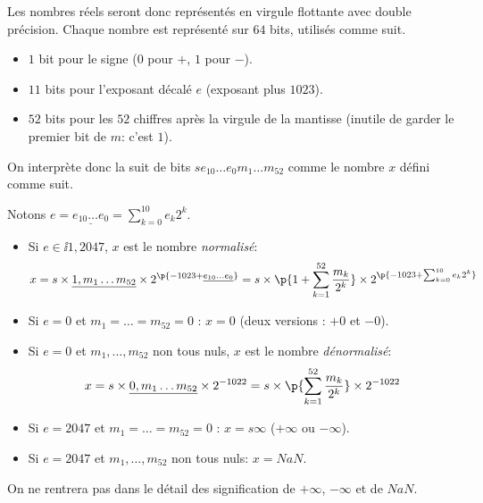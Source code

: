 
Les nombres réels seront donc représentés en virgule flottante avec double précision. Chaque nombre est  représenté sur $64$ bits, utilisés comme suit.
\begin{itemize}
\item[\textbullet] $1$ bit pour le signe ($0$ pour $+$, $1$ pour $-$).
\item[\textbullet] $11$ bits pour l'exposant décalé $e$ (exposant plus $1023$).
\item[\textbullet] $52$ bits pour les $52$ chiffres après la virgule de la mantisse
  (inutile de garder le premier bit de $m$: c'est $1$).
\end{itemize}

On interprète donc la suit de bits $se_{10}\ldots e_{0}m_{1}\ldots m_{52}$ comme le nombre $x$ défini comme suit. 

Notons $\displaystyle e  = \underline{e_{10}\ldots e_{0}} = \sum_{k=0}^{10} e_k2^k$. 
\begin{itemize}
  \item Si $e\in\ii{1,2047}$, $x$ est le  nombre \emph{normalisé}:
\begin{equation*}
  x = s \times \underline{1,m_{1}\ldots m_{52}}\times
  2^{\p{-1023+\underline{e_{10}\ldots  e_{0}}}}
  = 
  s \times \p{1+\sum_{k=1}^{52} \frac{m_{k}}{2^{k}}}
  \times 2^{\p{-1023 + \sum_{k=0}^{10} e_{k}2^{k}}}
\end{equation*}

\item Si $e = 0$ et $m_{1}=\dots=m_{52}=0$ : $x=0$ (deux
  versions : $+0$ et $-0$).

\item  Si $e = 0$ et $m_{1},\ldots,m_{52}$ non tous nuls, $x$ est le nombre
\emph{dénormalisé}:
\begin{equation*}
  x = s \times \underline{0,m_{1}\ldots m_{52}}\times
  2^{-1022}
  = 
  s \times \p{\sum_{k=1}^{52} \frac{m_{k}}{2^{k}}}
  \times 2^{-1022}
\end{equation*}

\item  Si $e= 2047$ et $m_{1}=\ldots= m_{52}=0$ : $x = s\infty$ ($+\infty$
ou $-\infty$).

\item  Si $e = 2047$ et $m_{1},\ldots, m_{52}$ non tous nuls: $x=NaN$.
\end{itemize}
\begin{rem}
  On ne rentrera pas dans le détail des signification de $+\infty$, $-\infty$ et de $NaN$.
\end{rem}


